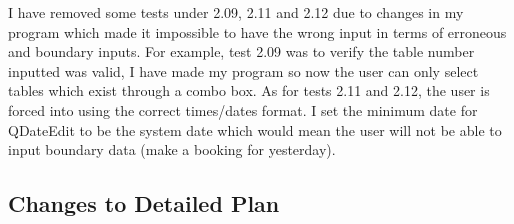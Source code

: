 \begin{landscape}
\begin{center}
\begin{longtable}{|p{1.5cm}|p{2.5cm}|p{2.5cm}|p{2cm}|p{2cm}|p{2cm}|p{2cm}|p{2cm}|}
    \end{longtable}
\end{center}
	I have removed some tests under 2.09, 2.11 and 2.12 due to changes in my program which made it impossible to have the wrong input in terms of erroneous and boundary inputs. For example, test 2.09 was to verify the table number inputted was valid, I have made my program so now the user can only select tables which exist through a combo box. As for tests 2.11 and 2.12, the user is forced into using the correct times/dates format. I set the minimum date for QDateEdit to be the system date which would mean the user will not be able to input boundary data (make a booking for yesterday).

\subsection{Changes to Detailed Plan}


\end{landscape}
